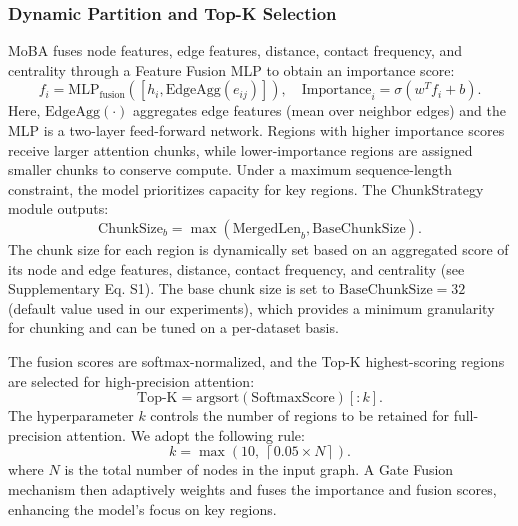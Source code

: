 \documentclass[11pt,a4paper]{article}
\theoremstyle{plain}
\theoremstyle{definition}
\begin{document}
\subsubsection{Dynamic Partition and Top-K Selection}
MoBA fuses node features, edge features, distance, contact frequency, and centrality through a Feature Fusion MLP to obtain an importance score:
\begin{equation}
f_i = \text{MLP}_{\text{fusion}}([h_i, \text{EdgeAgg}(e_{ij})]),\quad
\text{Importance}_i = \sigma(w^T f_i + b).
\end{equation}
Here, $\text{EdgeAgg}(\cdot)$ aggregates edge features (mean over neighbor edges) and the MLP is a two-layer feed-forward network. Regions with higher importance scores receive larger attention chunks, while lower-importance regions are assigned smaller chunks to conserve compute. Under a maximum sequence-length constraint, the model prioritizes capacity for key regions. The ChunkStrategy module outputs:
\begin{equation}
\text{ChunkSize}_b = \max(\text{MergedLen}_b, \text{BaseChunkSize}).
\end{equation}
The chunk size for each region is dynamically set based on an aggregated score of its node and edge features, distance, contact frequency, and centrality (see Supplementary Eq. S1). The base chunk size is set to $\text{BaseChunkSize}=32$ (default value used in our experiments), which provides a minimum granularity for chunking and can be tuned on a per-dataset basis.

The fusion scores are softmax-normalized, and the Top-K highest-scoring regions are selected for high-precision attention:
\begin{equation}
\text{Top-K} = \text{argsort}(\text{SoftmaxScore})[:k].
\end{equation}
The hyperparameter $k$ controls the number of regions to be retained for full-precision attention. We adopt the following rule:
\begin{equation}
k = \max\!\left(10,\ \left\lceil 0.05 \times N \right\rceil\right).
\end{equation}
where $N$ is the total number of nodes in the input graph. A Gate Fusion mechanism then adaptively weights and fuses the importance and fusion scores, enhancing the model's focus on key regions.
\end{document}
